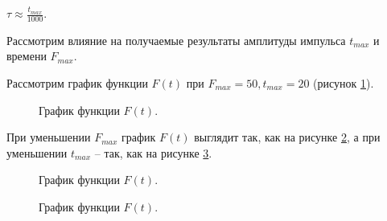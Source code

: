 \documentclass[a4paper,14pt]{article}
\begin{document}
$\tau \approx \frac{t_{max}}{1000}$.

Рассмотрим влияние на получаемые результаты
амплитуды импульса $t_{max}$ и времени $F_{max}$.

Рассмотрим график функции $F(t)$ при $F_{max} = 50, t_{max} = 20$ (рисунок \ref{fig:basegraph}).

\begin{figure}[!h]
	\caption{График функции $F(t)$.}
	\label{fig:basegraph}
\end{figure}

При уменьшении $F_{max}$ график $F(t)$ выглядит так, как на рисунке \ref{fig:lessF},
а при уменьшении $t_{max}$ -- так, как на рисунке \ref{fig:lesst}.

\begin{figure}[!h]
	\caption{График функции $F(t)$.}
	\label{fig:lessF}
\end{figure}

\begin{figure}[!h]
	\caption{График функции $F(t)$.}
	\label{fig:lesst}
\end{figure}
\newpage
\end{document}
